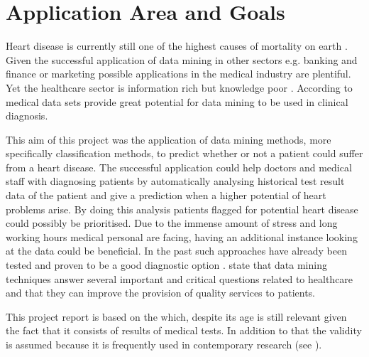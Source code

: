 \section{Application Area and Goals}

Heart disease is currently still one of the highest causes of mortality on earth \citep{nahar2013, kavitha2016, statistischesbundesamt2020}.
Given the successful application of data mining in other sectors e.g. banking and finance or marketing \citep{keles2017} possible applications in the medical industry are plentiful. Yet the healthcare sector is information rich but knowledge poor \citep{soni2011}. According to \citet{soni2011} medical data sets provide great potential for data mining to be used in clinical diagnosis.


This aim of this project was the application of data mining methods, more specifically classification methods, to predict whether or not a patient could suffer from a heart disease. The successful application could help doctors and medical staff with diagnosing patients by automatically analysing historical test result data of the patient and give a prediction when a higher potential of heart problems arise. By doing this analysis patients flagged for potential heart disease could possibly be prioritised. Due to the immense amount of stress and long working hours medical personal are facing, having an additional instance looking at the data could be beneficial. 
In the past such approaches have already been tested and proven to be a good diagnostic option \citep{usharani2011}. \citet{jabbar2013} state that data mining techniques answer several important and critical questions related to healthcare and that they can improve the provision of quality services to patients.

This project report is based on the  \citep{janosi1988} which, despite its age is still relevant given the fact that it consists of results of medical tests. In addition to that the validity is assumed because it is frequently used in contemporary research (see \cite{usharani2011, aha1988, nahar2013}).
